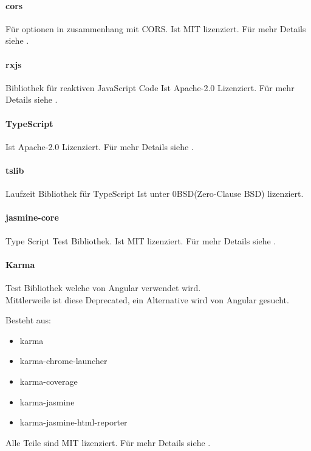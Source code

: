 \paragraph{cors}
Für optionen in zusammenhang mit CORS.
Ist MIT lizenziert.
Für mehr Details siehe .

\paragraph{rxjs}
Bibliothek für reaktiven JavaScript Code
Ist Apache-2.0 Lizenziert.
Für mehr Details siehe .

\paragraph{TypeScript}
Ist Apache-2.0 Lizenziert.
Für mehr Details siehe .

\paragraph{tslib}
Laufzeit Bibliothek für TypeScript
Ist unter 0BSD(Zero-Clause BSD) lizenziert.

\paragraph{jasmine-core}
Type Script Test Bibliothek.
Ist MIT lizenziert.
Für mehr Details siehe .

\paragraph{Karma}
Test Bibliothek welche von Angular verwendet wird.\\
Mittlerweile ist diese Deprecated, ein Alternative wird von Angular gesucht.

Besteht aus:
\begin{itemize}
    \item karma
    \item karma-chrome-launcher
    \item karma-coverage
    \item karma-jasmine
    \item karma-jasmine-html-reporter
\end{itemize}

Alle Teile sind MIT lizenziert.
Für mehr Details siehe .


